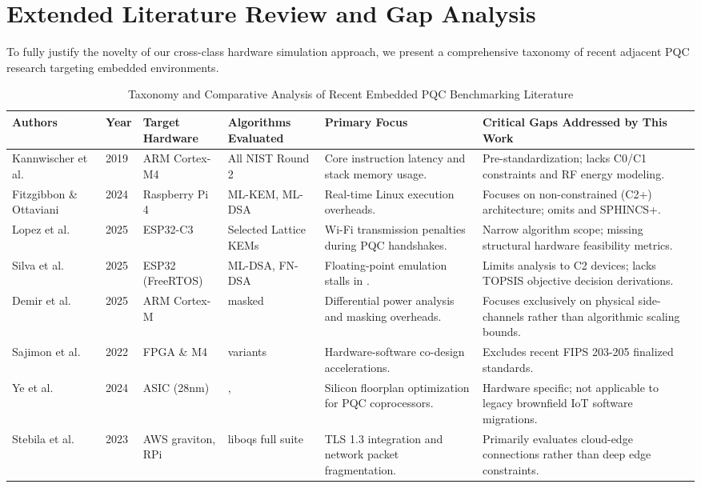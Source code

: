 \section{Extended Literature Review and Gap Analysis}
\label{sec:extended_lit}

To fully justify the novelty of our cross-class hardware simulation approach, we present a comprehensive taxonomy of recent adjacent PQC research targeting embedded environments. 

\begin{table}[htbp]
\caption{Taxonomy and Comparative Analysis of Recent Embedded PQC Benchmarking Literature}
\label{tab:lit_review}
\centering
\begin{tabularx}{\textwidth}{l l l X X X}
\toprule
\textbf{Authors} & \textbf{Year} & \textbf{Target Hardware} & \textbf{Algorithms Evaluated} & \textbf{Primary Focus} & \textbf{Critical Gaps Addressed by This Work} \\
\midrule
Kannwischer et al. \cite{kannwischer2019pqm4} & 2019 & ARM Cortex-M4 & All NIST Round 2 & Core instruction latency and stack memory usage. & Pre-standardization; lacks C0/C1 constraints and RF energy modeling. \\
Fitzgibbon \& Ottaviani \cite{fitzgibbon2024benchmarking} & 2024 & Raspberry Pi 4 & ML-KEM, ML-DSA & Real-time Linux execution overheads. & Focuses on non-constrained (C2+) architecture; omits \falcon{} and SPHINCS+. \\
Lopez et al. \cite{lopez2025post} & 2025 & ESP32-C3 & Selected Lattice KEMs & Wi-Fi transmission penalties during PQC handshakes. & Narrow algorithm scope; missing structural hardware feasibility metrics. \\
Silva et al. \cite{secrypt2025esp32} & 2025 & ESP32 (FreeRTOS) & ML-DSA, FN-DSA & Floating-point emulation stalls in \falcon{}. & Limits analysis to C2 devices; lacks TOPSIS objective decision derivations. \\
Demir et al. \cite{demir2025power} & 2025 & ARM Cortex-M & \kyber{} masked & Differential power analysis and masking overheads. & Focuses exclusively on physical side-channels rather than algorithmic scaling bounds. \\
Sajimon et al. \cite{sajimon2022lightweight} & 2022 & FPGA \& M4 & \ntru{} variants & Hardware-software co-design accelerations. & Excludes recent FIPS 203-205 finalized standards. \\
Ye et al. \cite{ye2024highly} & 2024 & ASIC (28nm) & \kyber{}, \dilithium{} & Silicon floorplan optimization for PQC coprocessors. & Hardware specific; not applicable to legacy brownfield IoT software migrations. \\
Stebila et al. \cite{acmccs2023oqs} & 2023 & AWS graviton, RPi & liboqs full suite & TLS 1.3 integration and network packet fragmentation. & Primarily evaluates cloud-edge connections rather than deep edge constraints. \\
\bottomrule
\end{tabularx}
\end{table}

